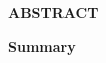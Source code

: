 \documentclass[9pt, letterpaper]{article}
\begin{document}
	\maketitle
	\begin{center}
		\textbf{ABSTRACT}
	\end{center}
	
	\vspace{1in}
	\begin{center}
		\textbf{Summary}
	\end{center}
	
\end{document}
